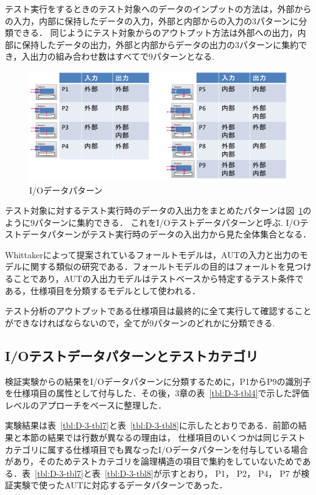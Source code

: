 テスト実行をするときのテスト対象へのデータのインプットの方法は，外部からの入力，内部に保持したデータの入力，外部と内部からの入力の3パターンに分類できる．
同じようにテスト対象からのアウトプット方法は外部への出力，内部に保持したデータの出力，外部と内部からデータの出力の3パターンに集約でき，入出力の組み合わせ数はすべてで9パターンとなる.
\begin{figure}[htbp]
\begin{center}
\includegraphics[width=14cm]{./image/D-3-Fig5.png}
\caption{I/Oデータパターン}
\label{fig:D-4-Fig6}
\end{center}
\end{figure}

テスト対象に対するテスト実行時のデータの入出力をまとめたパターンは図~\ref{fig:D-4-Fig6}のように9パターンに集約できる．
これをI/Oテストデータパターンと呼ぶ.
I/Oテストデータパターンがテスト実行時のデータの入出力から見た全体集合となる．

Whittakerによって提案されているフォールトモデル\cite{whittaker2003break}は，AUTの入力と出力のモデルに関する類似の研究である．フォールトモデルの目的はフォールトを見つけることであり，AUTの入出力モデルはテストベースから特定するテスト条件である，仕様項目を分類するモデルとして使われる．

テスト分析のアウトプットである仕様項目は最終的に全て実行して確認することができなければならないので，全てが9パターンのどれかに分類できる.

\subsection{I/Oテストデータパターンとテストカテゴリ}

検証実験からの結果をI/Oデータパターンに分類するために，P1からP9の識別子を仕様項目の属性として付与した．その後，3章の表~\ref{tbl:D-3-tbl4}で示した評価レベルのアプローチをベースに整理した．

実験結果は表~\ref{tbl:D-3-tbl7}と表~\ref{tbl:D-3-tbl8}に示したとおりである．前節の結果と本節の結果では行数が異なるの理由は， 仕様項目のいくつかは同じテストカテゴリに属する仕様項目でも異なったI/Oデータパターンを付与している場合があり，そのためテストカテゴリを論理構造の項目で集約をしていないためである．表~\ref{tbl:D-3-tbl7}と表~\ref{tbl:D-3-tbl8}が示すとおり， P1， P2， P4， P7 が検証実験で使ったAUTに対応するデータパターンであった．


